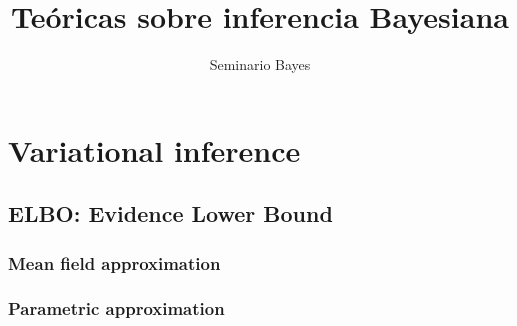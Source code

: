 \documentclass[a4paper,10pt]{book}
\title{Te\'oricas sobre inferencia Bayesiana}
\author{Seminario Bayes}
\begin{document}
\maketitle


\chapter{Variational inference}

\section{ELBO: Evidence Lower Bound}



\subsection{Mean field approximation}



\subsection{Parametric approximation}


\end{document}
